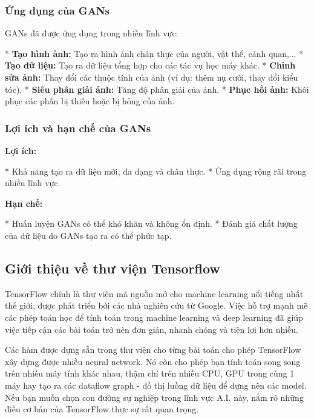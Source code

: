 \subsubsection{Ứng dụng của GANs}

GANs đã được ứng dụng trong nhiều lĩnh vực:

* \textbf{Tạo hình ảnh:} Tạo ra hình ảnh chân thực của người, vật thể, cảnh quan,...
* \textbf{Tạo dữ liệu:} Tạo ra dữ liệu tổng hợp cho các tác vụ học máy khác.
* \textbf{Chỉnh sửa ảnh:}  Thay đổi các thuộc tính của ảnh (ví dụ: thêm nụ cười, thay đổi kiểu tóc).
* \textbf{Siêu phân giải ảnh:} Tăng độ phân giải của ảnh.
* \textbf{Phục hồi ảnh:} Khôi phục các phần bị thiếu hoặc bị hỏng của ảnh.

\subsubsection{Lợi ích và hạn chế của GANs}

\textbf{Lợi ích:}

* Khả năng tạo ra dữ liệu mới, đa dạng và chân thực.
* Ứng dụng rộng rãi trong nhiều lĩnh vực.

\textbf{Hạn chế:}

* Huấn luyện GANs có thể khó khăn và không ổn định.
* Đánh giá chất lượng của dữ liệu do GANs tạo ra có thể phức tạp.

\subsection{Giới thiệu về thư viện Tensorflow}
\indent TensorFlow chính là thư viện mã nguồn mở cho machine learning nổi tiếng nhất thế giới, được phát triển bởi các nhà nghiên cứu từ Google. Việc hỗ trợ mạnh mẽ các phép toán học để tính toán trong machine learning và deep learning đã giúp việc tiếp cận các bài toán trở nên đơn giản, nhanh chóng và tiện lợi hơn nhiều. 

\indent Các hàm được dựng sẵn trong thư viện cho từng bài toán cho phép TensorFlow xây dựng được nhiều neural network. Nó còn cho phép bạn tính toán song song trên nhiều máy tính khác nhau, thậm chí trên nhiều CPU, GPU trong cùng 1 máy hay tạo ra các dataflow graph - đồ thị luồng dữ liệu để dựng nên các model. Nếu bạn muốn chọn con đường sự nghiệp trong lĩnh vực A.I. này, nắm rõ những điều cơ bản của TensorFlow thực sự rất quan trọng.

